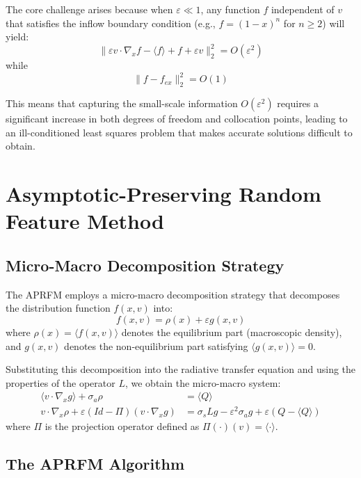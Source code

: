 \documentclass[11pt]{article}
\begin{document}
The core challenge arises because when $\varepsilon \ll 1$, any function $f$ independent of $v$ that satisfies the inflow boundary condition (e.g., $f = (1-x)^n$ for $n \geq 2$) will yield:
\begin{equation}
\|\varepsilon v \cdot \nabla_x f - \langle f \rangle + f + \varepsilon v \|_2^2 = O(\varepsilon^2)
\end{equation}
while
\begin{equation}
\|f - f_{ex}\|_2^2 = O(1)
\end{equation}

This means that capturing the small-scale information $O(\varepsilon^2)$ requires a significant increase in both degrees of freedom and collocation points, leading to an ill-conditioned least squares problem that makes accurate solutions difficult to obtain.

\section{Asymptotic-Preserving Random Feature Method}

\subsection{Micro-Macro Decomposition Strategy}

The APRFM employs a micro-macro decomposition strategy that decomposes the distribution function $f(x,v)$ into:
\begin{equation}
f(x,v) = \rho(x) + \varepsilon g(x,v)
\end{equation}
where $\rho(x) = \langle f(x,v) \rangle$ denotes the equilibrium part (macroscopic density), and $g(x,v)$ denotes the non-equilibrium part satisfying $\langle g(x,v) \rangle = 0$.

Substituting this decomposition into the radiative transfer equation and using the properties of the operator $L$, we obtain the micro-macro system:
\begin{align}
\langle v \cdot \nabla_x g \rangle + \sigma_a \rho &= \langle Q \rangle\\
v \cdot \nabla_x \rho + \varepsilon (Id - \Pi)(v \cdot \nabla_x g) &= \sigma_s L g - \varepsilon^2 \sigma_a g + \varepsilon (Q - \langle Q \rangle)
\end{align}
where $\Pi$ is the projection operator defined as $\Pi(\cdot)(v) = \langle \cdot \rangle$.

\subsection{The APRFM Algorithm}
\end{document}

